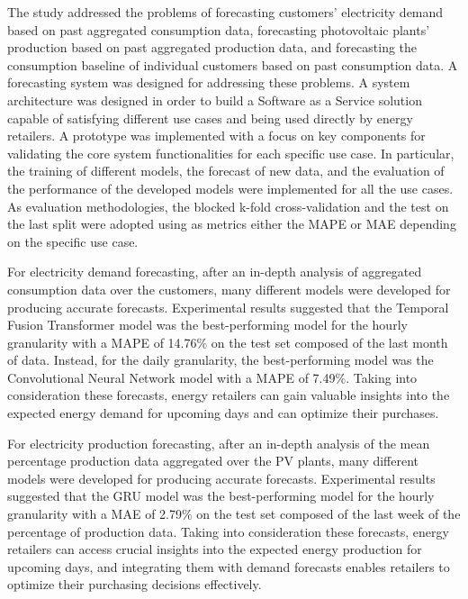 The study addressed the problems of forecasting customers' electricity demand based on past aggregated consumption data, forecasting photovoltaic plants' production based on past aggregated production data, and forecasting the consumption baseline of individual customers based on past consumption data.
A forecasting system was designed for addressing these problems.
A system architecture was designed in order to build a Software as a Service solution capable of satisfying different use cases and being used directly by energy retailers.
A prototype was implemented with a focus on key components for validating the core system functionalities for each specific use case.
In particular, the training of different models, the forecast of new data, and the evaluation of the performance of the developed models were implemented for all the use cases.
As evaluation methodologies, the blocked k-fold cross-validation and the test on the last split were adopted using as metrics either the MAPE or MAE depending on the specific use case.

For electricity demand forecasting, after an in-depth analysis of aggregated consumption data over the customers, many different models were developed for producing accurate forecasts.
Experimental results suggested that the Temporal Fusion Transformer model was the best-performing model for the hourly granularity with a MAPE of 14.76\% on the test set composed of the last month of data.
Instead, for the daily granularity, the best-performing model was the Convolutional Neural Network model with a MAPE of 7.49\%.
Taking into consideration these forecasts, energy retailers can gain valuable insights into the expected energy demand for upcoming days and can optimize their purchases.

For electricity production forecasting, after an in-depth analysis of the mean percentage production data aggregated over the PV plants, many different models were developed for producing accurate forecasts.
Experimental results suggested that the GRU model was the best-performing model for the hourly granularity with a MAE of 2.79\% on the test set composed of the last week of the percentage of production data.
Taking into consideration these forecasts, energy retailers can access crucial insights into the expected energy production for upcoming days, and integrating them with demand forecasts enables retailers to optimize their purchasing decisions effectively.

